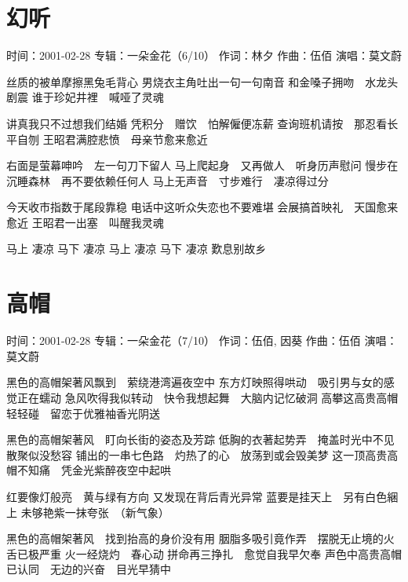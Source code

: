 \documentclass[UTF8,a4paper,oneside,twocolumn,12pt]{ctexbook}
\newcommand{\infopair}[2]{\textbullet #1：#2}
\newcommand{\zc}[1][伍佰]{\infopair{作词}{#1}}
\newcommand{\zq}[1][伍佰]{\infopair{作曲}{#1}}
\newcommand{\zj}[1]{\infopair{专辑}{#1}}
\newcommand{\sj}[1]{\infopair{时间}{#1}}
\newenvironment{info}{\begin{flushleft}\kaishu
	}
	{\end{flushleft}\normalsize\yahei\par}
\newenvironment{lyric}{
	}
{}
\begin{document}
\section{幻听}
\begin{info}
	\sj{2001-02-28}
	\zj{一朵金花（6/10）}
	\zc[林夕]
	\zq
	\infopair{演唱}{莫文蔚}
\end{info}
\begin{lyric}
	丝质的被单摩擦黑兔毛背心
	男烧衣主角吐出一句一句南音
	和金嗓子拥吻　水龙头剧震
	谁于珍妃井裡　喊哑了灵魂

	讲真我只不过想我们结婚
	凭积分　赠饮　怕解僱便冻薪
	查询班机请按　那忍看长平自刎
	王昭君满腔悲愤　母亲节愈来愈近

	右面是萤幕呻吟　左一句刀下留人
	马上爬起身　又再做人　听身历声慰问
	慢步在沉睡森林　再不要依赖任何人
	马上无声音　寸步难行　凄凉得过分

	今天收市指数于尾段靠稳
	电话中这听众失恋也不要难堪
	会展搞首映礼　天国愈来愈近
	王昭君一出塞　叫醒我灵魂

	马上 凄凉 马下 凄凉
	马上 凄凉 马下 凄凉
	歎息别故乡
\end{lyric}

\section{高帽}
\begin{info}
	\sj{2001-02-28}
	\zj{一朵金花（7/10）}
	\zc[伍佰, 因葵]
	\zq
	\infopair{演唱}{莫文蔚}
\end{info}
\begin{lyric}
	黑色的高帽架著风飘到　萦绕港湾遍夜空中
	东方灯映照得哄动　吸引男与女的感觉正在蠕动
	急风吹得我似转动　快令我想起舞　大脑内记忆破洞
	高攀这高贵高帽轻轻碰　留恋于优雅袖香光阴送

	黑色的高帽架著风　盯向长街的姿态及芳踪
	低胸的衣著起势弄　掩盖时光中不见散聚似没愁容
	铺出的一串七色路　灼热了的心　放荡到或会毁美梦
	这一顶高贵高帽不知痛　凭金光紫醉夜空中起哄

	红要像灯般亮　黄与绿有方向
	又发现在背后青光异常
	蓝要是挂天上　另有白色綑上
	未够艳紫一抹夸张　（新气象）

	黑色的高帽架著风　找到抬高的身价没有用
	胭脂多吸引竟作弄　摆脱无止境的火舌已极严重
	火一经烧灼　春心动
	拼命再三挣扎　愈觉自我早欠奉
	声色中高贵高帽已认同　无边的兴奋　目光早猜中
\end{lyric}
\end{document}
